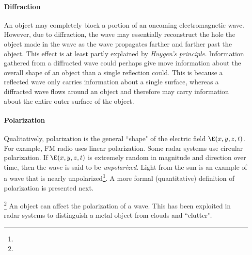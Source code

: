 \paragraph{Diffraction}
An object may completely block a portion of an oncoming electromagnetic wave.
However, due to diffraction, the wave may essentially reconstruct the
hole the object made in the wave as the wave propagates farther and farther past
the object.  This effect is at least partly explained by {\em Huygen's principle}.
Information gathered from a diffracted wave could perhaps give move
information about the overall shape of an object than a single reflection could.
This is because a reflected wave only carries information about a single surface,
whereas a diffracted wave flows around an object and therefore may carry information
about the entire outer surface of the object.

\paragraph{Polarization}
Qualitatively, polarization is the general ``shape" of the electric field $\E(x,y,z,t)$.
For example, FM radio uses linear polarization.
Some radar systems use circular polarization.
If $\E(x,y,z,t)$ is extremely random in magnitude and direction over time,
then the wave is said to be {\em unpolarized}.
Light from the sun is an example of a wave that is nearly unpolarized\footnote{}.
A more formal (quantitative) definition of polarization is presented next.

\begin{definition}
\label{def:polarization}
\end{definition}

\begin{remark}
\footnote{
  }
An object can affect the polarization of a wave.
This has been exploited in radar systems to distinguish a metal object from
clouds and ``clutter".
\end{remark}

